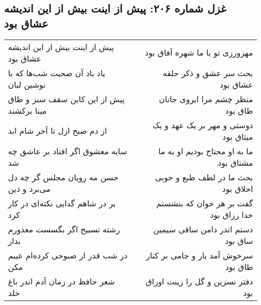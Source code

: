 \begin{center}
\section*{غزل شماره ۲۰۶: پیش از اینت بیش از این اندیشه عشاق بود}
\label{sec:sh206}
\begin{longtable}{l p{0.5cm} r}
پیش از اینت بیش از این اندیشه عشاق بود
&&
مهرورزی تو با ما شهره آفاق بود
\\
یاد باد آن صحبت شب‌ها که با نوشین لبان
&&
بحث سر عشق و ذکر حلقه عشاق بود
\\
پیش از این کاین سقف سبز و طاق مینا برکشند
&&
منظر چشم مرا ابروی جانان طاق بود
\\
از دم صبح ازل تا آخر شام ابد
&&
دوستی و مهر بر یک عهد و یک میثاق بود
\\
سایه معشوق اگر افتاد بر عاشق چه شد
&&
ما به او محتاج بودیم او به ما مشتاق بود
\\
حسن مه رویان مجلس گر چه دل می‌برد و دین
&&
بحث ما در لطف طبع و خوبی اخلاق بود
\\
بر در شاهم گدایی نکته‌ای در کار کرد
&&
گفت بر هر خوان که بنشستم خدا رزاق بود
\\
رشته تسبیح اگر بگسست معذورم بدار
&&
دستم اندر دامن ساقی سیمین ساق بود
\\
در شب قدر ار صبوحی کرده‌ام عیبم مکن
&&
سرخوش آمد یار و جامی بر کنار طاق بود
\\
شعر حافظ در زمان آدم اندر باغ خلد
&&
دفتر نسرین و گل را زینت اوراق بود
\\
\end{longtable}
\end{center}
